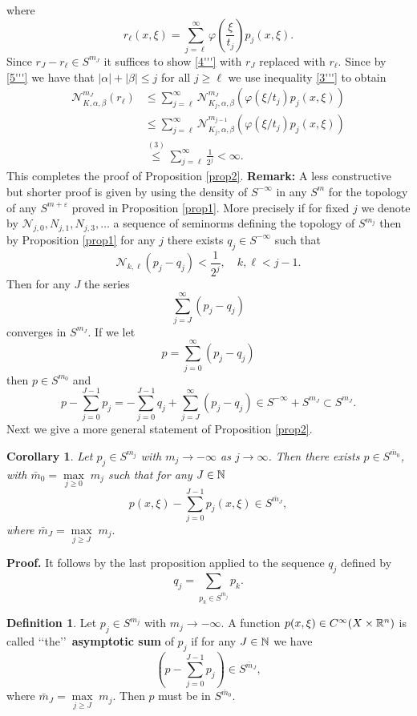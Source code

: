 \documentclass[12pt,reqno]{amsart}
\theoremstyle{plain}  %
\newtheorem{corollary}{Corollary}
\theoremstyle{definition}
\newtheorem{definition}{Definition}
\newcommand{\ve}{\varepsilon}
\newcommand{\nin}{\noindent}
\newcommand{\vph}{\varphi}
\begin{document}
where
$$r_\ell(x, \xi)  = \sum^\infty_{j=\ell}
\vph (\frac{\xi}{t_j}) p_j (x, \xi).$$
Since $ r_J-r_\ell \in S^{m_J} $ it suffices to show \eqref{4'''} with $r_J$ replaced
with $ r_\ell$.  Since by \eqref{5'''} we have that $
|\alpha| + |\beta| \le j $ for all $ j \ge \ell $ we use inequality
\eqref{3'''} to obtain   
\begin{equation*}
	\begin{split}
		\mathcal N^{m_J}_{K, \alpha,
\beta} (r_\ell)  
&\le \sum^\infty_{j=\ell} \mathcal N^{m_J}_{K_j, \alpha, \beta} 
\left (\vph  (\xi/t_j) p_j (x, \xi)\right )\\
 &\le \sum^\infty_{j= \ell} \mathcal N^{m_{j-1}}_{K_j, \alpha, \beta} 
 \left (\vph (\xi/t_j) p_j (x, \xi)\right )\\ 
 & \overset{(3)} \le \sum^\infty_{j =\ell} \frac{1}{2^j} < \infty.
\end{split}
\end{equation*}
This completes the proof of Proposition \ref{prop2}. 
\vskip0.2in
\nin
{\bf Remark:}  A less constructive but shorter proof is given by using
the density of $ S^{-\infty } $ in any $ S^m $ for the topology of any $
S^{m+\ve} $ proved in Proposition \ref{prop1}.  More precisely if for fixed $ j $
we denote by $ \mathcal N_{j,0}, N_{j,1}, N_{j,3}, \dots $ a sequence of
seminorms defining  the topology of $ S^{m_j} $ then by Proposition
\ref{prop1} for any $ j $ there exists $ q_j \in S^{- \infty} $ such that
$$\mathcal N_{k, \ell} (p_j - q_j) < \frac{1}{2^j}, \quad  k, \ell < j-1.$$
Then for any $ J $ the series
$$\sum^\infty_{j=J} (p_j - q_j)$$
converges in $ S^{m_J}$.  If we let
$$p = \sum^\infty_{j=0} (p_j - q_j) $$
then $ p \in S^{m_0} $ and
$$p - \sum^{J-1}_{j=0} p_j = - \sum^{J-1}_{j=0} q_j +
\sum^\infty_{j=J} (p_j - q_j) \in S^{- \infty} + S^{m_J} \subset
S^{m_J}.$$
Next we give a more general statement of Proposition \ref{prop2}.
\begin{corollary}  Let $ p_j \in S^{m_j} $ with $ m_j \longrightarrow
- \infty $ as $ j \to \infty$.  Then there exists $ p \in S^{\bar m_0}$,
with $ \bar m_0 = \underset{j \ge 0} \max \; m_j $ such that for
any $ J \in \Bbb N $
$$p(x, \xi) - \sum^{J-1}_{j=0} p_j (x, \xi) \in S^{\bar m_J},$$
where $ \bar m_J = \underset{j \ge J} \max \; m_j.$
\end{corollary}
\medskip
\nin
{\bf Proof.}  It follows by the last proposition applied to the
sequence $ q_j $ defined by
$$q_j = \sum_{p_k \in S^{\bar m_j}} p_k. $$
\begin{definition}  Let $ p_j \in S^{m_j} $ with $ m_j \longrightarrow
- \infty$.  A function $ p(x, \xi) \in C^\infty (X \times {\Bbb R^n}) $ is
called \lq\lq the\rq\rq \   {\bf asymptotic sum}  of $ p_j $ if for any $ J
\in \Bbb N $ we have
$$\left ( p - \sum^{J-1}_{j=0} p_j \right ) \in S^{\bar m_J}, $$
where $ \bar m_J = \underset{j \ge J} \max \; m_j$.  Then $ p $
must be in $ S^{\bar m_0}$.
\end{definition}
\end{document}
